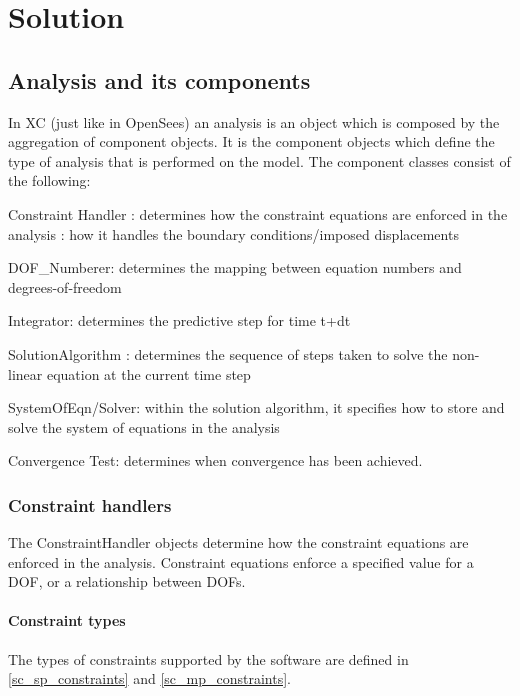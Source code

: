 \chapter{Solution}

\section{Analysis and its components}

In XC (just like in OpenSees) an analysis is an object which is composed by the aggregation of component objects. It is the component objects which define the type of analysis that is performed on the model. The component classes consist of the following:

\begin{description}
\item{Constraint Handler} : determines how the constraint equations are enforced in the analysis : how it handles the boundary conditions/imposed displacements
\item{DOF\_Numberer}: determines the mapping between equation numbers and degrees-of-freedom
\item{Integrator}: determines the predictive step for time t+dt
\item{SolutionAlgorithm} : determines the sequence of steps taken to solve the non-linear equation at the current time step
\item{SystemOfEqn/Solver}: within the solution algorithm, it specifies how to store and solve the system of equations in the analysis
\item{Convergence Test}: determines when convergence has been achieved. 
\end{description}

\subsection{Constraint handlers}\label{sc_constraint_handlers}
The ConstraintHandler objects determine how the constraint equations are enforced in the analysis. Constraint equations enforce a specified value for a DOF, or a relationship between DOFs.

\subsubsection{Constraint types}
The types of constraints supported by the software are defined in \ref{sc_sp_constraints} and \ref{sc_mp_constraints}.

